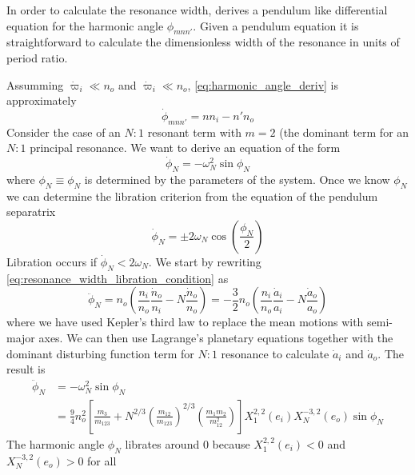 \documentclass[ twoside,openright,titlepage,numbers=noenddot,headinclude,%
                footinclude=true,cleardoublepage=empty,abstractoff, %
                BCOR=5mm,paper=a4,fontsize=11pt,%
                american,%
                ]{scrreprt}
\begin{document}
In order to calculate the resonance width, \cite{Mardling2013} derives
a pendulum like differential equation for the harmonic angle $\phi_{mnn'}$.
Given a pendulum equation it is straightforward to calculate the dimensionless
width of the resonance in units of period ratio.

Assumming $\dot{\varpi}_i\ll n_o$ and $\dot{\varpi}_i\ll n_o$,
\cref{eq:harmonic_angle_deriv} is approximately
\begin{equation}
    \dot{\phi}_{mnn'}=nn_i-n'n_o
    \label{eq:resonance_width_libration_condition}
\end{equation}
Consider the case of an $N:1$ resonant term with $m=2$ (the dominant
term for an $N:1$ principal resonance. We want to derive an equation of
the form
\begin{equation}
    \dot{\phi}_{N}=-\omega_{N}^2\sin\phi_{N}
\end{equation}
where $\phi_{N}\equiv\phi_N$ is determined by the parameters of the system. Once 
we know $\phi_{N}$ we can determine the libration criterion from the
equation of the pendulum separatrix 
\begin{equation}
    \dot{\phi}_{N}=\pm 2\omega_{N}\cos\left( \frac{\phi_{N}}{2} \right)
\end{equation}
Libration occurs if $\dot{\phi}_{N}<2\omega_{N}$. 
We start by rewriting \cref{eq:resonance_width_libration_condition} as
\begin{equation}
    \ddot{\phi}_{N}=n_o\left( \frac{n_i}{n_o} \frac{\dot{n}_o}{n_i} 
    -N \frac{\dot{n}_o}{n_o} \right)=- \frac{3}{2} n_o\left(
    \frac{n_i}{n_o} \frac{\dot{a}_i}{a_i} -N \frac{\dot{a}_o}{a_o} 
    \right)
\end{equation}
where we have used Kepler's third law to replace the mean motions with
semi-major axes. We can then use Lagrange's planetary equations 
together with the dominant disturbing function term for $N:1$ resonance
to calculate $\dot{a}_i$ and $\dot{a}_o$. The result is
\begin{equation}
\begin{aligned}
    \ddot{\phi}_{N}&=-\omega_{N}^2\sin\phi_{N}\\&= \frac{9}{4} 
    n_o^2\left[ \frac{m_3}{m_{123}} +
    N^{2/3}\left( \frac{m_{12}}{m_{123}}
    \right)^{2/3}\left( \frac{m_1m_2}{m_{12}^2} \right)\right]
    X^{2,2}_1(e_i)X^{-3,2}_N(e_o)\sin\phi_{N}
\end{aligned}
\end{equation}
The harmonic angle $\phi_N$ librates around $0$ because 
$X^{2,2}_1(e_i)<0$ and $X^{-3,2}_N(e_o)>0$ for all
\end{document}
